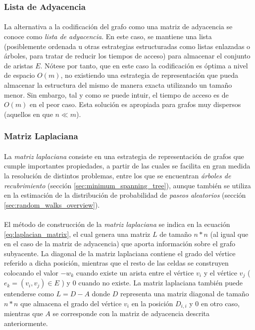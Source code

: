 \documentclass{subfiles}
\begin{document}
        \subsubsection{Lista de Adyacencia}
        \label{sec:adjacency_list}

          \paragraph{}
          La alternativa a la codificación del grafo como una matriz de adyacencia se conoce como \emph{lista de adyacencia}. En este caso, se mantiene una lista (posiblemente ordenada u otras estrategias estructuradas como listas enlazadas o árboles, para tratar de reducir los tiempos de acceso) para almacenar el conjunto de aristas $E$. Nótese por tanto, que en este caso la codificación es óptima a nivel de espacio $O(m)$, no existiendo una estrategia de representación que pueda almacenar la estructura del mismo de manera exacta utilizando un tamaño menor. Sin embargo, tal y como se puede intuir, el tiempo de acceso es de $O(m)$ en el peor caso. Esta solución es apropiada para grafos muy dispersos (aquellos en que $n \ll m$).

        \subsubsection{Matriz Laplaciana}
        \label{sec:laplacian_matrix}

          \paragraph{}
          La \emph{matriz laplaciana} consiste en una estrategia de representación de grafos que cumple importantes propiedades, a partir de las cuales se facilita en gran medida la resolución de distintos problemas, entre los que se encuentran \emph{árboles de recubrimiento} (sección \ref{sec:minimum_spanning_tree}), aunque también se utiliza en la estimación de la distribución de probabilidad de \emph{paseos aleatorios} (sección \ref{sec:random_walks_overview}).

          \paragraph{}
          El método de construcción de la \emph{matriz laplaciana} se indica en la ecuación \eqref{eq:laplacian_matrix}, el cual genera una matriz $L$ de tamaño $n * n$ (al igual que en el caso de la matriz de adyacencia) que aporta información sobre el grafo subyacente. La diagonal de la matriz laplaciana contiene el grado del vértice referido a dicha posición, mientras que el resto de las celdas se construyen colocando el valor $-w_k$ cuando existe un arista entre el vértice $v_i$ y el vértice $v_j$ ( $e_k = (v_i,v_j) \in E$ ) y $0$ cuando no existe. La matriz laplaciana también puede entenderse como $L = D - A$ donde $D$ representa una matriz diagonal de tamaño $n*n$ que almacena el grado del vértice $v_i$ en la posición $D_{i,i}$ y $0$ en otro caso, mientras que $A$ se corresponde con la matriz de adyacencia descrita anteriormente.
\end{document}

